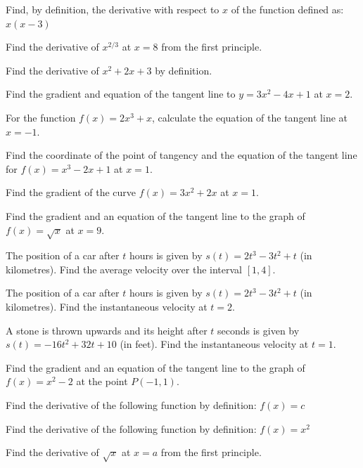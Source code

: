 \documentclass[11pt,a4paper]{article}
\begin{document}
\begin{shortlist}
\item Find, by definition, the derivative with respect to $x$ of the function defined as: $x(x-3)$

\item Find the derivative of $x^{2/3}$ at $x=8$ from the first principle.

\item Find the derivative of $x^2+2x+3$ by definition.

\item Find the gradient and equation of the tangent line to $y=3x^2-4x+1$ at $x=2$.

\item For the function $f(x)=2x^3+x$, calculate the equation of the tangent line at $x=-1$.

\item Find the coordinate of the point of tangency and the equation of the tangent line for $f(x)=x^3-2x+1$ at $x=1$.

\item Find the gradient of the curve $f(x)=3x^2+2x$ at $x=1$.

\item Find the gradient and an equation of the tangent line to the graph of $f(x)=\sqrt{x}$ at $x=9$.

\item The position of a car after $t$ hours is given by $s(t)=2t^3-3t^2+t$ (in kilometres). Find the average velocity over the interval $[1,4]$.

\item The position of a car after $t$ hours is given by $s(t)=2t^3-3t^2+t$ (in kilometres). Find the instantaneous velocity at $t=2$.

\item A stone is thrown upwards and its height after $t$ seconds is given by $s(t)=-16t^2+32t+10$ (in feet). Find the instantaneous velocity at $t=1$.

\item Find the gradient and an equation of the tangent line to the graph of $f(x)=x^2-2$ at the point $P(-1,1)$.

\item Find the derivative of the following function by definition: $f(x)=c$

\item Find the derivative of the following function by definition: $f(x)=x^2$

\item Find the derivative of $\sqrt{x}$ at $x=a$ from the first principle.


\end{shortlist}
\end{document}
